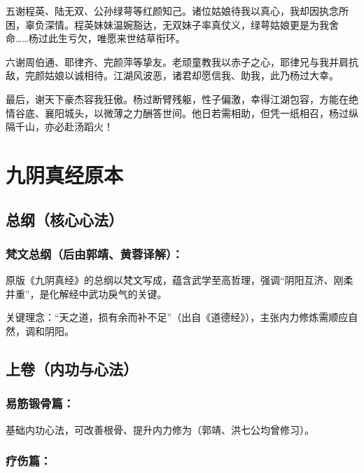\documentclass[doctor, vlined]{DissertUESTC}
\begin{document}
	五谢程英、陆无双、公孙绿萼等红颜知己。诸位姑娘待我以真心，我却因执念所困，辜负深情。程英妹妹温婉豁达，无双妹子率真仗义，绿萼姑娘更是为我舍命……杨过此生亏欠，唯愿来世结草衔环。

	六谢周伯通、耶律齐、完颜萍等挚友。老顽童教我以赤子之心，耶律兄与我并肩抗敌，完颜姑娘以诚相待。江湖风波恶，诸君却愿信我、助我，此乃杨过大幸。

	最后，谢天下豪杰容我狂傲。杨过断臂残躯，性子偏激，幸得江湖包容，方能在绝情谷底、襄阳城头，以微薄之力酬答世间。他日若需相助，但凭一纸相召，杨过纵隔千山，亦必赴汤蹈火！

	
	
	
	\appendix
	
	\chapter{九阴真经原本}
	
	\section{总纲（核心心法）}
	
	\subsection{梵文总纲（后由郭靖、黄蓉译解）：}

	原版《九阴真经》的总纲以梵文写成，蕴含武学至高哲理，强调“阴阳互济、刚柔并重”，是化解经中武功戾气的关键。

	关键理念：“天之道，损有余而补不足”（出自《道德经》），主张内力修炼需顺应自然，调和阴阳。

	\section{上卷（内功与心法）}
	
	\subsection{易筋锻骨篇：}

	基础内功心法，可改善根骨、提升内力修为（郭靖、洪七公均曾修习）。

	\subsection{疗伤篇：}
\end{document}
